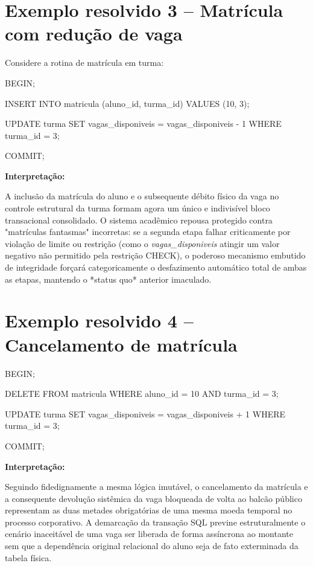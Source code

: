 \section{Exemplo resolvido 3 -- Matrícula com redução de vaga}

Considere a rotina de matrícula em turma:

\begin{sqlcode}
BEGIN;

INSERT INTO matricula (aluno_id, turma_id)
VALUES (10, 3);

UPDATE turma
SET vagas_disponiveis = vagas_disponiveis - 1
WHERE turma_id = 3;

COMMIT;
\end{sqlcode}

\textbf{Interpretação:}

A inclusão da matrícula do aluno e o subsequente débito físico da vaga no controle estrutural da turma formam agora um único e indivisível bloco transacional consolidado. O sistema acadêmico repousa protegido contra "matrículas fantasmas" incorretas: se a segunda etapa falhar criticamente por violação de limite ou restrição (como o \textit{vagas\_disponiveis} atingir um valor negativo não permitido pela restrição CHECK), o poderoso mecanismo embutido de integridade forçará categoricamente o desfazimento automático total de ambas as etapas, mantendo o *status quo* anterior imaculado.

\section{Exemplo resolvido 4 -- Cancelamento de matrícula}

\begin{sqlcode}
BEGIN;

DELETE FROM matricula
WHERE aluno_id = 10
  AND turma_id = 3;

UPDATE turma
SET vagas_disponiveis = vagas_disponiveis + 1
WHERE turma_id = 3;

COMMIT;
\end{sqlcode}

\textbf{Interpretação:}

Seguindo fidedignamente a mesma lógica imutável, o cancelamento da matrícula e a consequente devolução sistêmica da vaga bloqueada de volta ao balcão público representam as duas metades obrigatórias de uma mesma moeda temporal no processo corporativo. A demarcação da transação SQL previne estruturalmente o cenário inaceitável de uma vaga ser liberada de forma assíncrona ao montante sem que a dependência original relacional do aluno seja de fato exterminada da tabela física.

